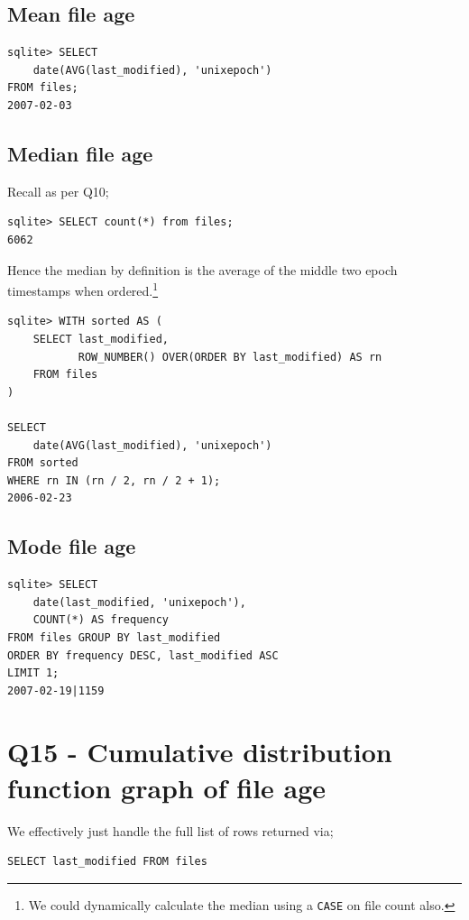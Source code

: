 \documentclass{article}
\begin{document}
\subsection*{Mean file age}
\begin{verbatim}
sqlite> SELECT 
    date(AVG(last_modified), 'unixepoch')
FROM files;
2007-02-03
\end{verbatim}

\subsection*{Median file age}
Recall as per Q10; 

\begin{verbatim}
sqlite> SELECT count(*) from files;
6062
\end{verbatim}

Hence the median by definition is the average of the middle two epoch timestamps when ordered.\footnote{We could dynamically calculate the median using a \texttt{CASE} on file count also.}

\begin{verbatim}
sqlite> WITH sorted AS (
    SELECT last_modified,
           ROW_NUMBER() OVER(ORDER BY last_modified) AS rn
    FROM files
)

SELECT 
    date(AVG(last_modified), 'unixepoch')
FROM sorted
WHERE rn IN (rn / 2, rn / 2 + 1);
2006-02-23
\end{verbatim}

\subsection*{Mode file age}

\begin{verbatim}
sqlite> SELECT
    date(last_modified, 'unixepoch'),
    COUNT(*) AS frequency
FROM files GROUP BY last_modified   
ORDER BY frequency DESC, last_modified ASC
LIMIT 1;
2007-02-19|1159
\end{verbatim}

\newpage

\section*{Q15 - Cumulative distribution function graph of file age}
We effectively just handle the full list of rows returned via;

\begin{small}
\begin{verbatim}
SELECT last_modified FROM files
\end{verbatim}
\end{small}
\end{document}
